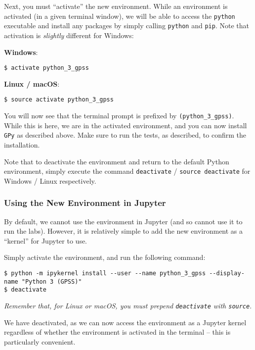 \documentclass[11pt]{article}
\begin{document}
Next, you must ``activate'' the new environment. While an environment is
activated (in a given terminal window), we will be able to access the
\texttt{python} executable and install any packages by simply calling
\texttt{python} and \texttt{pip}. Note that activation is
\emph{slightly} different for Windows:

\textbf{Windows}:

\begin{verbatim}
$ activate python_3_gpss
\end{verbatim}

\textbf{Linux / macOS}:

\begin{verbatim}
$ source activate python_3_gpss
\end{verbatim}

You will now see that the terminal prompt is prefixed by
\texttt{(python\_3\_gpss)}. While this is here, we are in the activated
environment, and you can now install \texttt{GPy} as described above.
Make sure to run the tests, as described, to confirm the installation.

Note that to deactivate the environment and return to the default Python
environment, simply execute the command \texttt{deactivate} /
\texttt{source\ deactivate} for Windows / Linux respectively.

\hypertarget{using-the-new-environment-in-jupyter}{%
\subsubsection{Using the New Environment in
Jupyter}\label{using-the-new-environment-in-jupyter}}

By default, we cannot use the environment in Jupyter (and so cannot use
it to run the labs). However, it is relatively simple to add the new
environment as a ``kernel'' for Jupyter to use.

Simply activate the environment, and run the following command:

\begin{verbatim}
$ python -m ipykernel install --user --name python_3_gpss --display-name "Python 3 (GPSS)"
$ deactivate
\end{verbatim}

\emph{Remember that, for Linux or macOS, you must prepend
\texttt{deactivate} with \texttt{source}}.

We have deactivated, as we can now access the environment as a Jupyter
kernel regardless of whether the environment is activated in the
terminal -- this is particularly convenient.
\end{document}
